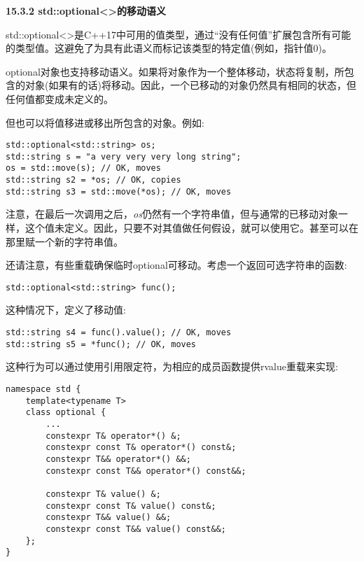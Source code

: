 \hspace*{\fill} \par %
\textbf{15.3.2 std::optional<>的移动语义}

std::optional<>是C++17中可用的值类型，通过“没有任何值”扩展包含所有可能的类型值。这避免了为具有此语义而标记该类型的特定值(例如，指针值0)。\par

optional对象也支持移动语义。如果将对象作为一个整体移动，状态将复制，所包含的对象(如果有的话)将移动。因此，一个已移动的对象仍然具有相同的状态，但任何值都变成未定义的。\par

但也可以将值移进或移出所包含的对象。例如:\par

\begin{lstlisting}[caption={}]
std::optional<std::string> os;
std::string s = "a very very very long string";
os = std::move(s); // OK, moves
std::string s2 = *os; // OK, copies
std::string s3 = std::move(*os); // OK, moves
\end{lstlisting}

注意，在最后一次调用之后，\textit{os}仍然有一个字符串值，但与通常的已移动对象一样，这个值未定义。因此，只要不对其值做任何假设，就可以使用它。甚至可以在那里赋一个新的字符串值。\par

还请注意，有些重载确保临时optional可移动。考虑一个返回可选字符串的函数:\par

\begin{lstlisting}[caption={}]
std::optional<std::string> func();
\end{lstlisting}

这种情况下，定义了移动值:\par

\begin{lstlisting}[caption={}]
std::string s4 = func().value(); // OK, moves
std::string s5 = *func(); // OK, moves
\end{lstlisting}

这种行为可以通过使用引用限定符，为相应的成员函数提供rvalue重载来实现:\par

\begin{lstlisting}[caption={}]
namespace std {
	template<typename T>
	class optional {
		...
		constexpr T& operator*() &;
		constexpr const T& operator*() const&;
		constexpr T&& operator*() &&;
		constexpr const T&& operator*() const&&;
		
		constexpr T& value() &;
		constexpr const T& value() const&;
		constexpr T&& value() &&;
		constexpr const T&& value() const&&;
	};
}
\end{lstlisting}

